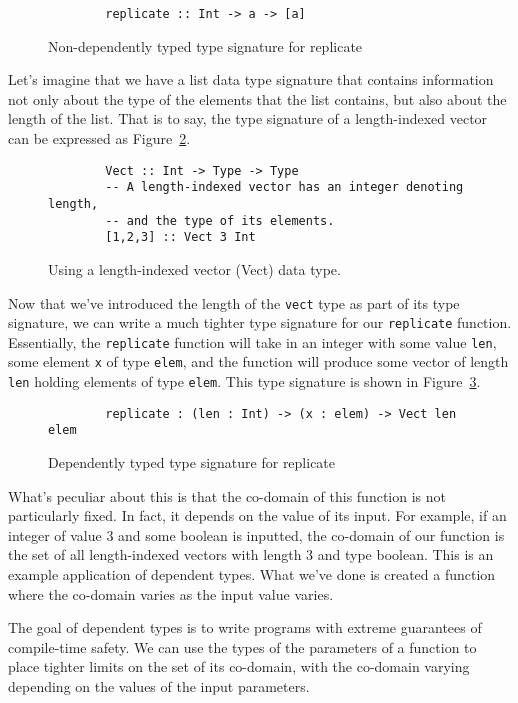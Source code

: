 \begin{figure}[ht!!!!!!!]
    \caption{Non-dependently typed type signature for replicate}
    \label{replicate_dec}
    \begin{lstlisting}
        replicate :: Int -> a -> [a]
    \end{lstlisting}
\end{figure} 


Let's imagine that we have a list data type signature that contains information
not only about the type of the elements that the list contains, but also about
the length of the list. That is to say, the type signature of a length-indexed
vector can be expressed as Figure~\ref{vect}.

\begin{figure}[ht!!!]
    \caption{Using a length-indexed vector (Vect) data type.}
    \label{vect}
    \begin{lstlisting}
        Vect :: Int -> Type -> Type 
        -- A length-indexed vector has an integer denoting length, 
        -- and the type of its elements. 
        [1,2,3] :: Vect 3 Int
    \end{lstlisting}
\end{figure} 


Now that we've introduced the length of the \texttt{vect} type as part of its
type signature, we can write a much tighter type signature for our
\texttt{replicate} function. Essentially, the \texttt{replicate} function will
take in an integer with some value \texttt{len}, some element \texttt{x} of type
\texttt{elem}, and the function will produce some vector of length \texttt{len}
holding elements of type \texttt{elem}. This type signature is shown in
Figure~\ref{dtvect}. 

\begin{figure}
    \caption{Dependently typed type signature for replicate}
    \label{dtvect}
    \begin{lstlisting}
        replicate : (len : Int) -> (x : elem) -> Vect len elem
    \end{lstlisting}
\end{figure} 

What's peculiar about this is that the co-domain of this function is not
particularly fixed. In fact, it depends on the value of its input. For example,
if an integer of value 3 and some boolean is inputted, the co-domain of our
function is the set of all length-indexed vectors with length 3 and type
boolean. This is an example application of dependent types. What we've done is
created a function where the co-domain varies as the input value varies. 

The goal of dependent types is to write programs with extreme guarantees of
compile-time safety. We can use the types of the parameters of a function to
place tighter limits on the set of its co-domain, with the co-domain varying
depending on the values of the input parameters. 